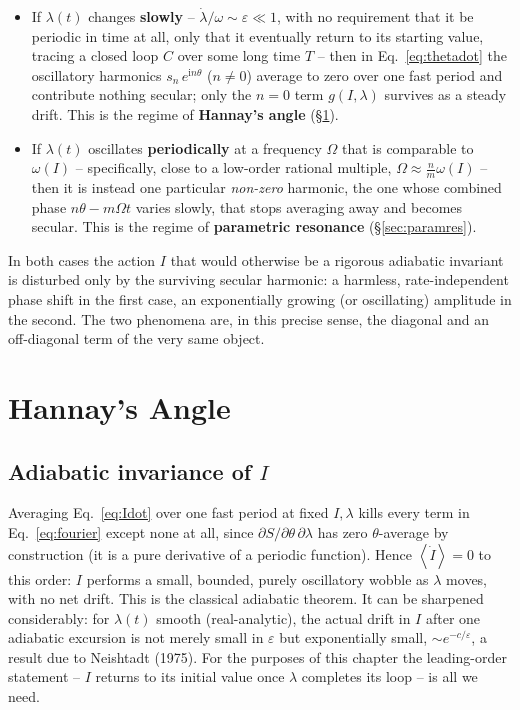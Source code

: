 \documentclass[11pt]{book}
\newcommand{\ii}{\mathrm{i}}
\newcommand{\avg}[1]{\left\langle #1 \right\rangle}
\begin{document}
\begin{itemize}[leftmargin=1.4em]
\item If $\lambda(t)$ changes \textbf{slowly} -- $\dot\lambda/\omega \sim \varepsilon \ll 1$, with
no requirement that it be periodic in time at all, only that it eventually return to its starting
value, tracing a closed loop $C$ over some long time $T$ -- then in Eq.~\eqref{eq:thetadot} the
oscillatory harmonics $s_n\,e^{\ii n\theta}$ ($n\neq 0$) average to zero over one fast period and
contribute nothing secular; only the $n=0$ term $g(I,\lambda)$ survives as a steady drift. This is
the regime of \textbf{Hannay's angle} (\S\ref{sec:hannay}).

\item If $\lambda(t)$ oscillates \textbf{periodically} at a frequency $\Omega$ that is comparable
to $\omega(I)$ -- specifically, close to a low-order rational multiple, $\Omega \approx
\frac{n}{m}\omega(I)$ -- then it is instead one particular \emph{non-zero} harmonic, the one whose
combined phase $n\theta - m\Omega t$ varies slowly, that stops averaging away and becomes secular.
This is the regime of \textbf{parametric resonance} (\S\ref{sec:paramres}).
\end{itemize}

In both cases the action $I$ that would otherwise be a rigorous adiabatic invariant is disturbed
only by the surviving secular harmonic: a harmless, rate-independent phase shift in the first case,
an exponentially growing (or oscillating) amplitude in the second. The two phenomena are, in this
precise sense, the diagonal and an off-diagonal term of the very same object.

\section{Hannay's Angle}
\label{sec:hannay}

\subsection{Adiabatic invariance of $I$}

Averaging Eq.~\eqref{eq:Idot} over one fast period at fixed $I,\lambda$ kills every term in
Eq.~\eqref{eq:fourier} except none at all, since $\partial S/\partial\theta\,\partial\lambda$ has
zero $\theta$-average by construction (it is a pure derivative of a periodic function). Hence
$\avg{\dot I} = 0$ to this order: $I$ performs a small, bounded, purely oscillatory wobble as
$\lambda$ moves, with no net drift. This is the classical adiabatic theorem. It can be sharpened
considerably: for $\lambda(t)$ smooth (real-analytic), the actual drift in $I$ after one adiabatic
excursion is not merely small in $\varepsilon$ but exponentially small, $\sim
e^{-c/\varepsilon}$, a result due to Neishtadt (1975). For the purposes of this chapter the
leading-order statement -- $I$ returns to its initial value once $\lambda$ completes its loop --
is all we need.
\end{document}
